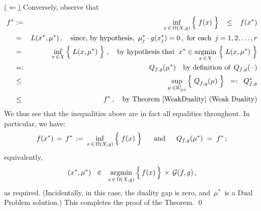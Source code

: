 \vskip 0.5cm
\noindent
\underline{($\Longleftarrow$)}
\quad
Conversely, observe that
\vskip -0.45cm
\begin{eqnarray*}
f^{*}
& := &
	\underset{x\,\in\,\Omega(X,g)}{\inf}\left\{\;
		\overset{{\color{white}.}}{f(x)}
		\;\right\}
\;\;\; \leq \;\;\;
	f(x^{*})
\\
& = &
	L(x^{*},\mu^{*})\,,
	\quad\textnormal{since, by hypothesis, \,$\mu_{j}^{*} \cdot g(x_{j}^{*}) = 0$\,, \,for each \,$j = 1,2,\ldots,r$}
\\
& = &
	\underset{x\,\in X}{\inf}\left\{\;\overset{{\color{white}.}}{L}(x,\mu^{*})\;\right\}\,,
	\quad\textnormal{by hypothesis that \,$x^{*} \in \underset{x\,\in X}{\argmin}\,\left\{\;\overset{{\color{white}.}}{L}(x,\mu^{*})\;\right\}$}
\\
& =: &
	Q_{f,g}(\mu^{*})
	\quad\textnormal{by definition of \,$Q_{f,g}(\,\cdot\,)$}
\\
& \leq &
	\underset{\mu\,\in\Re_{\geq 0}^{r}}{\sup}\left\{\;\overset{{\color{white}.}}{Q}_{f,g}(\mu)\;\right\}
\;\; =: \;\;
	Q_{f,g}^{*}
\\
& \leq &
	f^{*}\,,
	\quad\textnormal{by Theorem \ref{WeakDuality} (Weak Duality)}
\end{eqnarray*}
We thus see that the inequalities above are in fact all equalities throughout.
In particular, we have:
\begin{equation*}
f(x^{*}) \,=\, f^{*} \,:=\,
	\underset{x\,\in\,\Omega(X,g)}{\inf}\left\{\;
		\overset{{\color{white}.}}{f(x)}
		\;\right\}
\;\;\quad\textnormal{and}\quad\;\;
Q_{f,g}(\mu^{*}) \; = \; f^{*}\,;
\end{equation*}
equivalently,
\begin{equation*}
(x^{*},\mu^{*})
	\;\; \in \;\;
	\underset{x\,\in\,\Omega(X,g)}{\argmin}\left\{\,\overset{{\color{white}.}}{f}(x)\,\right\}
	\,\times\,
	\mathcal{G}(f,g)\,,
\end{equation*}
as required.
(Incidentally, in this case, the duality gap is zero, and \,$\mu^{*}$\, is a Dual Problem solution.)
This completes the proof of the Theorem.
\qed


